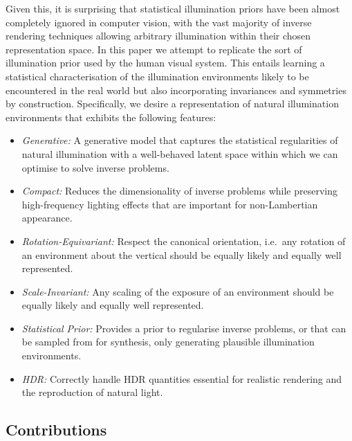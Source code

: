 Given this, it is surprising that statistical illumination priors have been almost completely ignored in computer vision, with the vast majority of inverse rendering techniques allowing arbitrary illumination within their chosen representation space. In this paper we attempt to replicate the sort of illumination prior used by the human visual system. This entails learning a statistical characterisation of the illumination environments likely to be encountered in the real world but also incorporating invariances and symmetries by construction. Specifically, we desire a representation of natural illumination environments that exhibits the following features:
\begin{itemize}
    \item \emph{Generative:} A generative model that captures the statistical regularities of natural illumination with a well-behaved latent space within which we can optimise to solve inverse problems.
    \item \emph{Compact:} Reduces the dimensionality of inverse problems while preserving high-frequency lighting effects that are important for non-Lambertian appearance.
    \item \emph{Rotation-Equivariant:} Respect the canonical orientation, i.e.~any rotation of an environment about the vertical should be equally likely and equally well represented.
    \item \emph{Scale-Invariant:} Any scaling of the exposure of an environment should be equally likely and equally well represented.
    \item \emph{Statistical Prior:} Provides a prior to regularise inverse problems, or that can be sampled from for synthesis, only generating plausible illumination environments.
    \item \emph{HDR:} Correctly handle HDR quantities essential for realistic rendering and the reproduction of natural light.
\end{itemize}

\subsection{Contributions}

